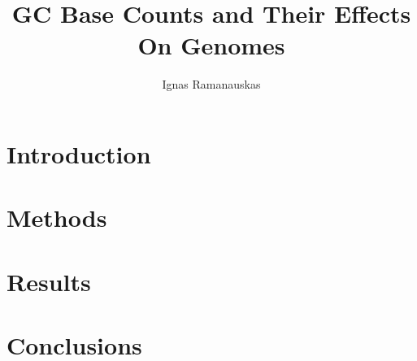 \documentclass{article}
\author{Ignas Ramanauskas}
\title{\textbf{GC Base Counts and Their Effects On Genomes}}
\begin{document}
\maketitle

\section{Introduction}


\section{Methods}


\clearpage
\section{Results}


\section{Conclusions}



\end{document}
